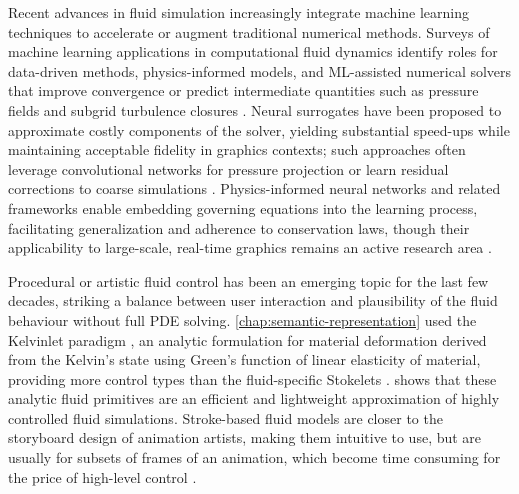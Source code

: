 Recent advances in fluid simulation increasingly integrate machine learning techniques to accelerate or augment traditional numerical methods. Surveys of machine learning applications in computational fluid dynamics identify roles for data-driven methods, physics-informed models, and ML-assisted numerical solvers that improve convergence or predict intermediate quantities such as pressure fields and subgrid turbulence closures \cite{Huang2022NN}. Neural surrogates have been proposed to approximate costly components of the solver, yielding substantial speed-ups while maintaining acceptable fidelity in graphics contexts; such approaches often leverage convolutional networks for pressure projection or learn residual corrections to coarse simulations \cite{Tompson2017,Sousa2024}. Physics-informed neural networks and related frameworks enable embedding governing equations into the learning process, facilitating generalization and adherence to conservation laws, though their applicability to large-scale, real-time graphics remains an active research area \cite{Brunton2025}.


Procedural or artistic fluid control has been an emerging topic for the last few decades, striking a balance between user interaction and plausibility of the fluid behaviour without full PDE solving. \cref{chap:semantic-representation} used the Kelvinlet paradigm \cite{DeGoes2017}, an analytic formulation for material deformation derived from the Kelvin's state using Green's function of linear elasticity of material, providing more control types than the fluid-specific Stokelets \cite{Chwang1976}. \citep{Wejchert1991} shows that these analytic fluid primitives are an efficient and lightweight approximation of highly controlled fluid simulations. Stroke-based fluid models are closer to the storyboard design of animation artists, making them intuitive to use, but are usually for subsets of frames of an animation, which become time consuming for the price of high-level control \cite{Xing2016,Patel2005,Yan2020b,Pan2013}. 

